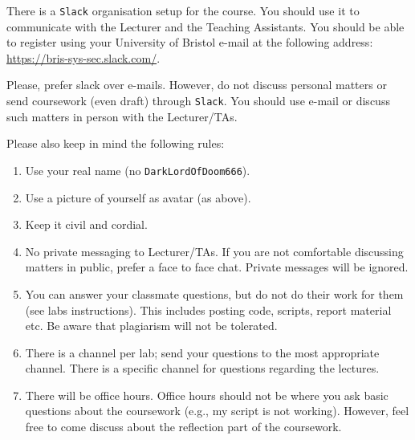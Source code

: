 \documentclass[10pt]{article}
\begin{document}
\maketitle

There is a \texttt{Slack} organisation setup for the course.
You should use it to communicate with the Lecturer and the Teaching Assistants.
You should be able to register using your University of Bristol e-mail at the following address: \url{https://bris-sys-sec.slack.com/}.

Please, prefer slack over e-mails. However, do not discuss personal matters or send coursework (even draft) through \texttt{Slack}.
You should use e-mail or discuss such matters in person with the Lecturer/TAs.

\vspace{1cm}
Please also keep in mind the following rules:
\begin{enumerate}
	\itemsep0em
	\item Use your real name (no \texttt{DarkLordOfDoom666}).
	\item Use a picture of yourself as avatar (as above).
	\item Keep it civil and cordial.
	\item No private messaging to Lecturer/TAs. If you are not comfortable discussing matters in public, prefer a face to face chat.
	Private messages will be ignored.
	\item You can answer your classmate questions, but do not do their work for them (see labs instructions). This includes posting code, scripts, report material etc.
	Be aware that plagiarism will not be tolerated.
	\item There is a channel per lab; send your questions to the most appropriate channel. 
	There is a specific channel for questions regarding the lectures.
	\item There will be office hours. 
	Office hours should not be where you ask basic questions about the coursework (e.g., my script is not working).
	However, feel free to come discuss about the reflection part of the coursework.
\end{enumerate}
\end{document}

